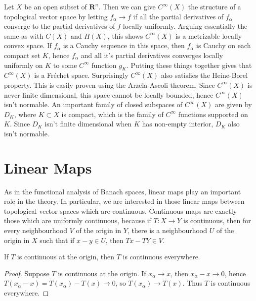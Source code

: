 \begin{example}
    Let $X$ be an open subset of $\mathbf{R}^n$. Then we can give $C^\infty(X)$ the structure of a topological vector space by letting $f_\alpha \to f$ if all the partial derivatives of $f_\alpha$ converge to the partial derivatives of $f$ locally uniformly. Arguing essentially the same as with $C(X)$ and $H(X)$, this shows $C^\infty(X)$ is a metrizable locally convex space. If $f_\alpha$ is a Cauchy sequence in this space, then $f_\alpha$ is Cauchy on each compact set $K$, hence $f_\alpha$ and all it's partial derivatives converges locally uniformly on $K$ to some $C^\infty$ function $g_K$. Putting these things together gives that $C^\infty(X)$ is a Fr\'{e}chet space. Surprisingly $C^\infty(X)$ also satisfies the Heine-Borel property. This is easily proven using the Arzela-Ascoli theorem. Since $C^\infty(X)$ is never finite dimensional, this space cannot be locally bounded, hence $C^\infty(X)$ isn't normable. An important family of closed subspaces of $C^\infty(X)$ are given by $D_K$, where $K \subset X$ is compact, which is the family of $C^\infty$ functions supported on $K$. Since $D_K$ isn't finite dimensional when $K$ has non-empty interior, $D_K$ also isn't normable.
\end{example}



\section{Linear Maps}

As in the functional analysis of Banach spaces, linear maps play an important role in the theory. In particular, we are interested in those linear maps between topological vector spaces which are continuous. Continuous maps are exactly those which are uniformly continuous, because if $T: X \to Y$ is continuous, then for every neighbourhood $V$ of the origin in $Y$, there is a neighbourhood $U$ of the origin in $X$ such that if $x - y \in U$, then $Tx - TY \in V$.

\begin{lemma}
    If $T$ is continuous at the origin, then $T$ is continuous everywhere.
\end{lemma}
\begin{proof}
    Suppose $T$ is continuous at the origin. If $x_\alpha \to x$, then $x_\alpha - x \to 0$, hence $T(x_\alpha - x) = T(x_\alpha) - T(x) \to 0$, so $T(x_\alpha) \to T(x)$. Thus $T$ is continuous everywhere.
\end{proof}

